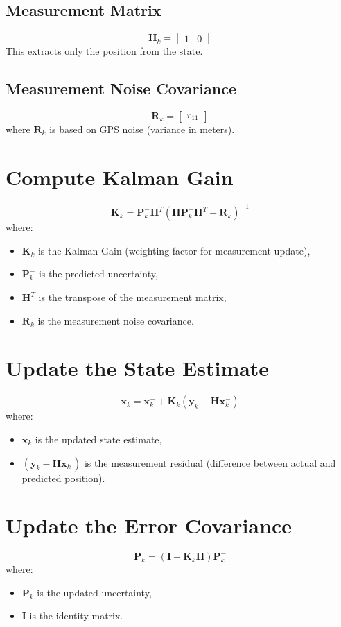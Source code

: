 \documentclass{article}
\begin{document}
\subsection{Measurement Matrix}
\[
\mathbf{H}_k =
\begin{bmatrix}
1 & 0
\end{bmatrix}
\]
This extracts only the position from the state.

\subsection{Measurement Noise Covariance}
\[
\mathbf{R}_k =
\begin{bmatrix}
r_{11}
\end{bmatrix}
\]
where $\mathbf{R}_k$ is based on GPS noise (variance in meters).

\section{Compute Kalman Gain}
\[
\mathbf{K}_k = \mathbf{P}_k^- \mathbf{H}^T (\mathbf{H} \mathbf{P}_k^- \mathbf{H}^T + \mathbf{R}_k)^{-1}
\]
where:
\begin{itemize}
    \item $\mathbf{K}_k$ is the Kalman Gain (weighting factor for measurement update),
    \item $\mathbf{P}_k^-$ is the predicted uncertainty,
    \item $\mathbf{H}^T$ is the transpose of the measurement matrix,
    \item $\mathbf{R}_k$ is the measurement noise covariance.
\end{itemize}

\section{Update the State Estimate}
\[
\mathbf{x}_k = \mathbf{x}_k^- + \mathbf{K}_k (\mathbf{y}_k - \mathbf{H} \mathbf{x}_k^-)
\]
where:
\begin{itemize}
    \item $\mathbf{x}_k$ is the updated state estimate,
    \item $(\mathbf{y}_k - \mathbf{H} \mathbf{x}_k^-)$ is the measurement residual (difference between actual and predicted position).
\end{itemize}

\section{Update the Error Covariance}
\[
\mathbf{P}_k = (\mathbf{I} - \mathbf{K}_k \mathbf{H}) \mathbf{P}_k^-
\]
where:
\begin{itemize}
    \item $\mathbf{P}_k$ is the updated uncertainty,
    \item $\mathbf{I}$ is the identity matrix.
\end{itemize}
\end{document}
